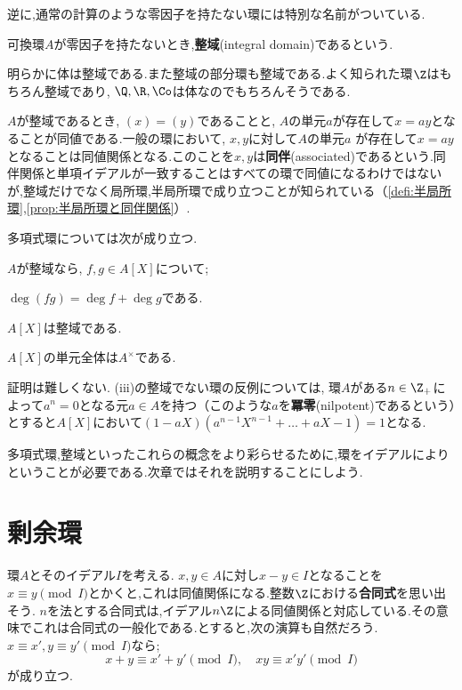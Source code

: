 逆に,通常の計算のような零因子を持たない環には特別な名前がついている.

\begin{defi}[整域]
	可換環$A$が零因子を持たないとき,\textbf{整域}(integral domain)であるという.
\end{defi}

明らかに体は整域である.また整域の部分環も整域である.よく知られた環$\Z$はもちろん整域であり, $\Q,\R,\Co$は体なのでもちろんそうである.

$A$が整域であるとき, $(x)=(y)$であることと, $A$の単元$a$が存在して$x=ay$となることが同値である.一般の環において, $x,y$に対して$A$の単元$a$
が存在して$x=ay$となることは同値関係となる.このことを$x,y$は\textbf{同伴}(associated)であるという.同伴関係と単項イデアルが一致することはすべての環で同値になるわけではないが,整域だけでなく局所環,半局所環で成り立つことが知られている（\ref{defi:半局所環},\ref{prop:半局所環と同伴関係}）.

多項式環については次が成り立つ.

\begin{prop}
	$A$が整域なら, $f,g\in A[X]$について;
	\begin{sakura}
		\item $\deg(fg)=\deg f+\deg g$である.
		\item $A[X]$は整域である.
		\item $A[X]$の単元全体は$A^\times$である.
	\end{sakura}
\end{prop}

証明は難しくない. (iii)の整域でない環の反例については, 環$A$がある$n\in\Z_+$によって$a^n=0$となる元$a\in A$を持つ（このような$a$を\textbf{冪零}(nilpotent)であるという）とすると$A[X]$において$(1-aX)(a^{n-1}X^{n-1}+\dots+aX-1)=1$となる.

多項式環,整域といったこれらの概念をより彩らせるために,環をイデアルによりということが必要である.次章ではそれを説明することにしよう.

\section{剰余環}

環$A$とそのイデアル$I$を考える. $x,y\in A$に対し$x-y\in I$となることを$x\equiv y \pmod I$とかくと,これは同値関係になる.整数$\Z$における\textbf{合同式}を思い出そう. $n$を法とする合同式は,イデアル$n\Z$による同値関係と対応している.その意味でこれは合同式の一般化である.とすると,次の演算も自然だろう. $x\equiv x',y\equiv y'\pmod I$なら;
\[x+y\equiv x'+y'\pmod I,\quad xy\equiv x'y'\pmod I\]
が成り立つ.

